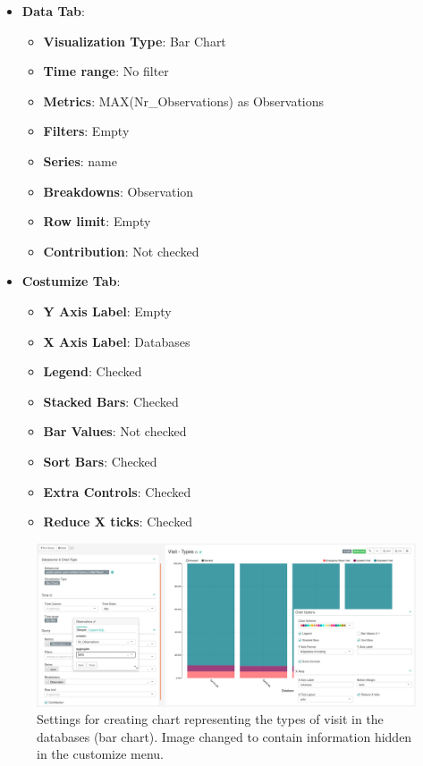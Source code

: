 \documentclass[]{book}
\providecommand{\tightlist}{%
  \setlength{\itemsep}{0pt}\setlength{\parskip}{0pt}}
\begin{document}
\begin{itemize}
\tightlist
\item
  \textbf{Data Tab}:

  \begin{itemize}
  \tightlist
  \item
    \textbf{Visualization Type}: Bar Chart
  \item
    \textbf{Time range}: No filter
  \item
    \textbf{Metrics}: MAX(Nr\_Observations) as Observations
  \item
    \textbf{Filters}: Empty
  \item
    \textbf{Series}: name
  \item
    \textbf{Breakdowns}: Observation
  \item
    \textbf{Row limit}: Empty
  \item
    \textbf{Contribution}: Not checked
  \end{itemize}
\item
  \textbf{Costumize Tab}:

  \begin{itemize}
  \tightlist
  \item
    \textbf{Y Axis Label}: Empty
  \item
    \textbf{X Axis Label}: Databases
  \item
    \textbf{Legend}: Checked
  \item
    \textbf{Stacked Bars}: Checked
  \item
    \textbf{Bar Values}: Not checked
  \item
    \textbf{Sort Bars}: Checked
  \item
    \textbf{Extra Controls}: Checked
  \item
    \textbf{Reduce X ticks}: Checked
  \end{itemize}
\end{itemize}

\begin{figure}
\includegraphics[width=1\linewidth]{images/visitTypes} \caption{Settings for creating chart representing the types of visit in the databases (bar chart). Image changed to contain information hidden in the customize menu.}\label{fig:visitTypes}
\end{figure}
\end{document}
